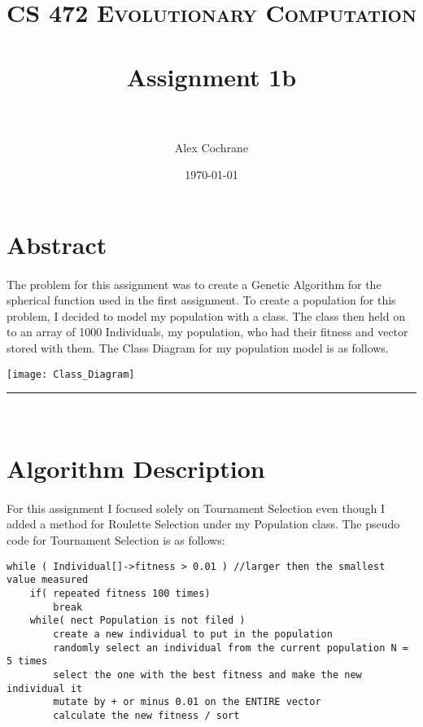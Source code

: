 \documentclass[paper=a4, fontsize=11pt]{scrartcl} %
\title{	
\normalfont \normalsize 
\textsc{CS 472 Evolutionary Computation} \\ [25pt] %
\horrule{0.5pt} \\[0.4cm] %
\huge Assignment 1b \\ %
\horrule{2pt} \\[0.5cm] %
}
\author{Alex Cochrane} %
\date{\normalsize\today} %
\numberwithin{equation}{section} %
\numberwithin{figure}{section} %
\numberwithin{table}{section} %
\newcommand{\horrule}[1]{\rule{\linewidth}{#1}} %
\begin{document}
\maketitle %


\section{Abstract}

\paragraph{} The problem for this assignment was to create a Genetic Algorithm for the spherical function used in the first assignment. To create a population for this problem, I decided to model my population with a class. The class then held on to an array of 1000 Individuals, my population, who had their fitness and vector stored with them. The Class Diagram for my population model is as follows.

\texttt{[image: Class\_Diagram]}

\horrule{0.5pt} \\[0.4cm] %
\section{Algorithm Description}

\paragraph{} For this assignment I focused solely on Tournament Selection even though I added a method for Roulette Selection under my Population class. The pseudo code for Tournament Selection is as follows:
\begin{verbatim}
while ( Individual[]->fitness > 0.01 ) //larger then the smallest value measured
    if( repeated fitness 100 times)
        break
    while( nect Population is not filed )
        create a new individual to put in the population
        randomly select an individual from the current population N = 5 times
        select the one with the best fitness and make the new individual it
        mutate by + or minus 0.01 on the ENTIRE vector
        calculate the new fitness / sort
\end{verbatim}
\end{document}
